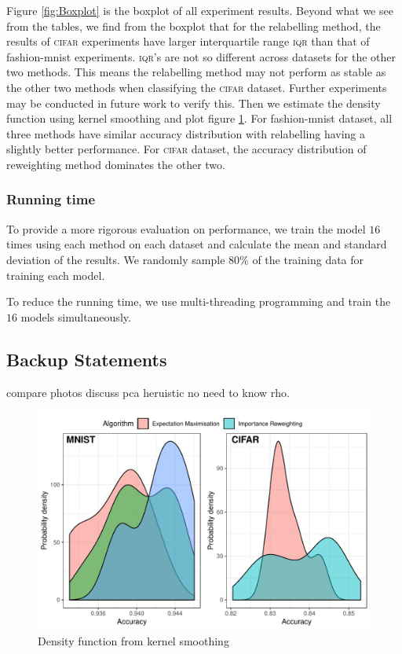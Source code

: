 \documentclass[12pt]{article} %
\begin{document}
Figure \ref{fig:Boxplot} is the boxplot of all experiment results. 
Beyond what we see from the tables, we find from the boxplot that for the relabelling method, the results of \textsc{cifar} experiments have larger interquartile range \textsc{iqr} than that of fashion-mnist experiments. 
\textsc{iqr}'s are not so different across datasets for the other two methods. 
This means the relabelling method may not perform as stable as the other two methods when classifying the \textsc{cifar} dataset. 
Further experiments may be conducted in future work to verify this. 
Then we estimate the density function using kernel smoothing and plot figure \ref{fig:Density function from kernel smoothing}.
For fashion-mnist dataset, all three methods have similar accuracy distribution with relabelling having a slightly better performance.
For \textsc{cifar} dataset, the accuracy distribution of reweighting method dominates the other two.
\subsubsection{Running time}

To provide a more rigorous evaluation on performance, we train the model $16$ times using each method on each dataset and calculate the mean and standard deviation of the results.
We randomly sample $80\%$ of the training data for training each model.

To reduce the running time, we use multi-threading programming and train the $16$ models simultaneously. \\

\subsection{Backup Statements}
compare photos
discuss pca
heruistic no need to know rho.





\begin{figure}   
    \centering
	\includegraphics[scale=0.9]{histo}
	\caption{Density function from kernel smoothing}
	\label{fig:Density function from kernel smoothing}
\end{figure}
\end{document}
